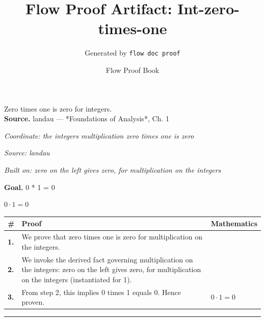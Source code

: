 \documentclass[11pt]{article}
\title{Flow Proof Artifact: Int-zero-times-one}
\author{Generated by \texttt{flow doc proof}}
\date{Flow Proof Book}
\theoremstyle{definition}
\begin{document}
\maketitle
Zero times one is zero for integers.\\[0.5em]
\textbf{Source.} landau — *Foundations of Analysis*, Ch. 1\\[0.5em]
\bigskip
{}\par
\smallskip\noindent\textit{Coordinate: the integers \cdot multiplication \cdot zero times one is zero}\par
\smallskip\noindent\textit{Source: landau}\par
\smallskip\noindent\textit{Built on: zero on the left gives zero, for multiplication on the integers}\par
\medskip
\noindent\textbf{Goal.} 0 * 1 = 0\par
\noindent$\displaystyle 0 \cdot 1 = 0$\par
\medskip
\noindent
\begin{tabular}{@{} >{\raggedright\arraybackslash}p{} >{\raggedright\arraybackslash}p{} >{\raggedleft\arraybackslash}p{} @{}}
\textbf{\#} & \textbf{Proof} & \textbf{Mathematics} \\
\midrule
\textbf{1.} & We prove that zero times one is zero for multiplication on the integers. & \\[0.45em]
\textbf{2.} & We invoke the derived fact governing multiplication on the integers: zero on the left gives zero, for multiplication on the integers (instantiated for 1). & \\[0.45em]
\textbf{3.} & From step 2, this implies 0 times 1 equals 0. Hence proven. & $\displaystyle 0 \cdot 1 = 0$ \\[0.45em]
\bottomrule
\end{tabular}
\label{thm:Int-multiplication-zero_times_one_is_zero}
\par\medskip\hrule
\end{document}

